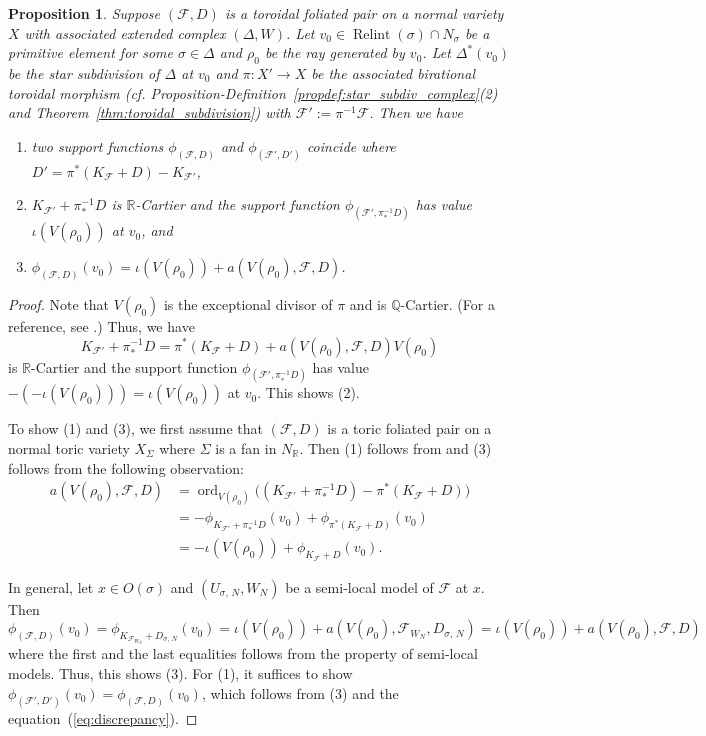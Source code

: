 \documentclass[12pt,reqno]{amsart}
\newtheorem{proposition}[theorem]{Proposition}
\theoremstyle{definition}
\newcommand{\on}{\operatorname}
\newcommand\cF{{\mathcal{F}}}
\newcommand\bQ{{\mathbb Q}}
\newcommand\bR{{\mathbb R}}
\begin{document}
\begin{proposition}\label{discrepancy}
    Suppose $(\cF,D)$ is a toroidal foliated pair on a normal variety $X$ with associated extended complex $(\Delta,W)$. 
    Let $v_0\in \on{Relint}(\sigma)\cap N_\sigma$ be a primitive element for some $\sigma\in\Delta$ and $\rho_0$ be the ray generated by $v_0$. 
    Let $\Delta^*(v_0)$ be the star subdivision of $\Delta$ at $v_0$ and $\pi\colon X'\to X$ be the associated birational toroidal morphism 
    (cf. Proposition-Definition~\ref{propdef:star_subdiv_complex}(2) and Theorem~\ref{thm:toroidal_subdivision}) with $\cF':=\pi^{-1}\cF$. 
    Then we have
    \begin{enumerate}
        \item two support functions $\phi_{(\cF,D)}$ and $\phi_{(\cF',D')}$ coincide where $D' = \pi^*(K_\cF+D)-K_{\cF'}$, 
        \item $K_{\cF'}+\pi_*^{-1}D$ is $\bR$-Cartier and the support function $\phi_{(\cF',\pi_*^{-1}D)}$ has value $\iota(V(\rho_0))$ at $v_0$, and 
        \item $\phi_{(\cF,D)}(v_0) = \iota(V(\rho_0))+a(V(\rho_0),\cF,D)$. 
    \end{enumerate}
\end{proposition}
\begin{proof}
    Note that $V(\rho_0)$ is the exceptional divisor of $\pi$ and is $\bQ$-Cartier. (For a reference, see \cite[Proposition 11.1.6]{CLS11}.) 
    Thus, we have 
    \begin{equation}\label{eq:discrepancy}
        K_{\cF'}+\pi_*^{-1}D = \pi^*(K_{\cF}+D)+a(V(\rho_0),\cF,D)V(\rho_0)
    \end{equation}
    is $\bR$-Cartier and the support function $\phi_{(\cF',\pi_*^{-1}D)}$ has value $-(-\iota(V(\rho_0)))=\iota(V(\rho_0))$ at $v_0$. 
    This shows (2). 

    To show (1) and (3), we first assume that $(\cF,D)$ is a toric foliated pair on a normal toric variety $X_\Sigma$ where $\Sigma$ is a fan in $N_\bR$. 
    Then (1) follows from \cite[Proposition 6.2.7]{CLS11} and (3) follows from the following observation: 
    \begin{align*}
            a(V(\rho_0),\cF,D) &= \on{ord}_{V(\rho_0)}\big((K_{\cF'}+\pi_*^{-1}D)-\pi^*(K_{\cF}+D)\big) \\
            &= -\phi_{K_{\cF'}+\pi_*^{-1}D}(v_0)+\phi_{\pi^*(K_{\cF}+D)}(v_0) \\ 
            &= -\iota(V(\rho_0))+\phi_{K_\cF+D}(v_0).
    \end{align*}
    
    In general, let $x\in O(\sigma)$ and $(U_{\sigma,\,N},W_N)$ be a semi-local model of $\cF$ at $x$. 
    Then 
    \[\phi_{(\cF,D)}(v_0)=\phi_{K_{\cF_{W_N}}+D_{\sigma,\,N}}(v_0)=\iota(V(\rho_0))+a(V(\rho_0),\cF_{W_N},D_{\sigma,\,N}) = \iota(V(\rho_0))+a(V(\rho_0),\cF,D)\]
    where the first and the last equalities follows from the property of semi-local models. 
    Thus, this shows (3). 
    For (1), it suffices to show $\phi_{(\cF',D')}(v_0) = \phi_{(\cF,D)}(v_0)$, which follows from (3) and the equation~(\ref{eq:discrepancy}). 
\end{proof}
\end{document}
